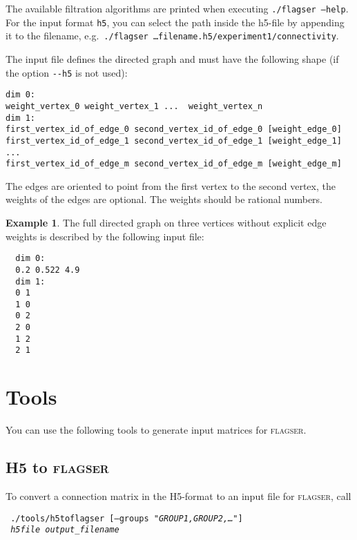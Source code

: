 \documentclass{amsart}
\theoremstyle{definition}
\newtheorem*{example*}{Example}
\begin{document}
The available filtration algorithms are printed when executing \texttt{./flagser --help}.
For the input format \texttt{h5}, you can select the path inside the h5-file by appending it to the
filename, e.g.\ \texttt{./flagser \ldots filename.h5/experiment1/connectivity}.

\vspace{1em}

\noindent
The input file defines the directed graph and must have the following shape (if the option
\texttt{-{}-h5} is not used):

\vspace{.5em}
\begin{verbatim}
dim 0:
weight_vertex_0 weight_vertex_1 ...  weight_vertex_n
dim 1:
first_vertex_id_of_edge_0 second_vertex_id_of_edge_0 [weight_edge_0]
first_vertex_id_of_edge_1 second_vertex_id_of_edge_1 [weight_edge_1]
...
first_vertex_id_of_edge_m second_vertex_id_of_edge_m [weight_edge_m]
\end{verbatim}
\vspace{.5em}

\noindent
The edges are oriented to point from the first vertex to the second vertex, the weights of the edges
are optional.
The weights should be rational numbers.

\begin{example*}
  The full directed graph on three vertices without explicit edge weights is described by the
  following input file:

  \vspace{.5em}
  \begin{verbatim}
  dim 0:
  0.2 0.522 4.9
  dim 1:
  0 1
  1 0
  0 2
  2 0
  1 2
  2 1
  \end{verbatim}
\end{example*}

\section{Tools}
You can use the following tools to generate input matrices for \textsc{flagser}.

\subsection{H5 to \textsc{flagser}}
To convert a connection matrix in the H5-format to an input file for \textsc{flagser}, call

\noindent
\verb| |\texttt{\qquad./tools/h5toflagser [--groups \textit{"GROUP1,GROUP2,\dots"}]} \\
\verb| |\texttt{\qquad{} \textit{h5file} \textit{output\_filename}}
\end{document}
